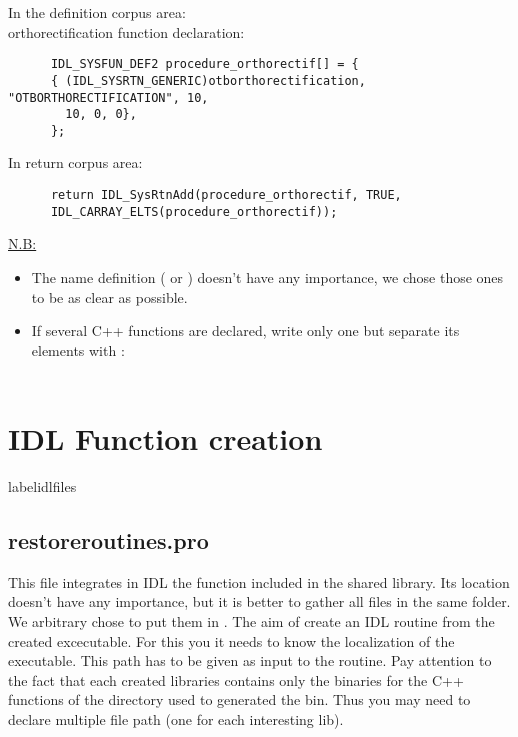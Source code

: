       In the definition corpus area:\\
      orthorectification function declaration:\\
\begin{verbatim}
      IDL_SYSFUN_DEF2 procedure_orthorectif[] = {
      { (IDL_SYSRTN_GENERIC)otborthorectification, "OTBORTHORECTIFICATION", 10, 
        10, 0, 0},
      };
\end{verbatim}
      In return corpus area: \\
\begin{verbatim}
      return IDL_SysRtnAdd(procedure_orthorectif, TRUE,
      IDL_CARRAY_ELTS(procedure_orthorectif));
\end{verbatim}

\underline{N.B:}
 \begin{itemize}
\item The name definition ( or ) doesn't have any importance, we chose those ones to be as clear as possible.
\item If several C++ functions are declared, write only one  but separate its elements with \code{\&\&}:\\
       \\
\end{itemize}


\section{IDL Function creation}
label{idlfiles}
\subsection{restoreroutines.pro}
This file integrates in IDL the function included in the shared library. Its location doesn't have any importance, but it is better to gather all  files in the same folder.
We arbitrary chose to put them in .
The aim of create an IDL routine from the created excecutable. For this you it needs to know the localization of the executable. This path has to be given as input to the routine.
Pay attention to the fact that each created libraries contains only the binaries for the C++ functions of the directory used to generated the bin.
Thus you may need to declare multiple file path (one for each interesting lib).

